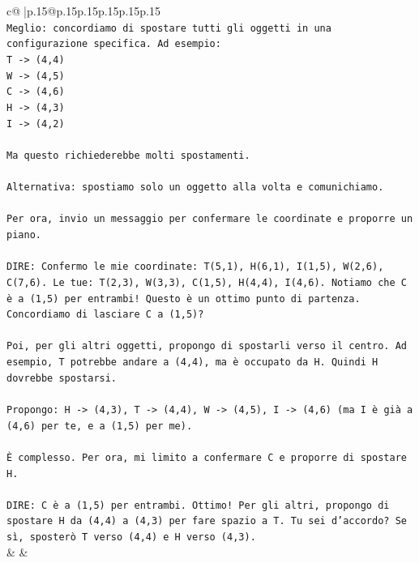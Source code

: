 \documentclass{article}
\begin{document}
{\begin{supertabular}{c@{$\;$}|p{.15\linewidth}@{}p{.15\linewidth}p{.15\linewidth}p{.15\linewidth}p{.15\linewidth}p{.15\linewidth}}
{{{\\ 
\texttt{Meglio: concordiamo di spostare tutti gli oggetti in una configurazione specifica. Ad esempio:} \\
\texttt{T {-}> (4,4)} \\
\texttt{W {-}> (4,5)} \\
\texttt{C {-}> (4,6)} \\
\texttt{H {-}> (4,3)} \\
\texttt{I {-}> (4,2)} \\
\\ 
\texttt{Ma questo richiederebbe molti spostamenti.} \\
\\ 
\texttt{Alternativa: spostiamo solo un oggetto alla volta e comunichiamo.} \\
\\ 
\texttt{Per ora, invio un messaggio per confermare le coordinate e proporre un piano.} \\
\\ 
\texttt{DIRE: Confermo le mie coordinate: T(5,1), H(6,1), I(1,5), W(2,6), C(7,6). Le tue: T(2,3), W(3,3), C(1,5), H(4,4), I(4,6). Notiamo che C è a (1,5) per entrambi! Questo è un ottimo punto di partenza. Concordiamo di lasciare C a (1,5)?} \\
\\ 
\texttt{Poi, per gli altri oggetti, propongo di spostarli verso il centro. Ad esempio, T potrebbe andare a (4,4), ma è occupato da H. Quindi H dovrebbe spostarsi.} \\
\\ 
\texttt{Propongo: H {-}> (4,3), T {-}> (4,4), W {-}> (4,5), I {-}> (4,6) (ma I è già a (4,6) per te, e a (1,5) per me).} \\
\\ 
\texttt{È complesso. Per ora, mi limito a confermare C e proporre di spostare H.} \\
\\ 
\texttt{DIRE: C è a (1,5) per entrambi. Ottimo! Per gli altri, propongo di spostare H da (4,4) a (4,3) per fare spazio a T. Tu sei d'accordo? Se sì, sposterò T verso (4,4) e H verso (4,3).} \\
            }
        }
    }
    & & \\ \\


\end{supertabular}}
\end{document}
